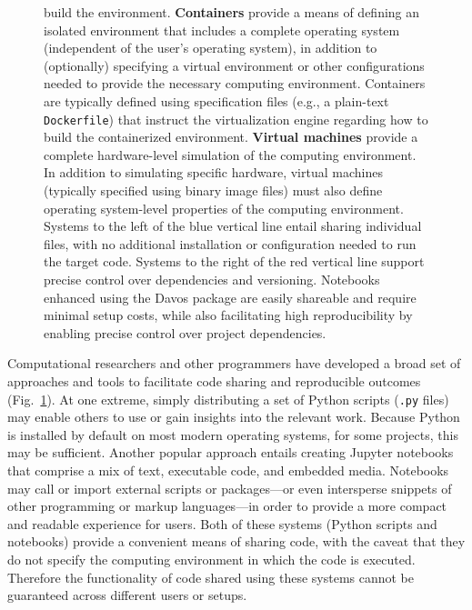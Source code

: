 \documentclass[preprint,12pt,a4paper]{elsarticle}
\begin{document}
\begin{figure}[tp]
{  build the environment.  \textbf{Containers} provide a means of
  defining an isolated environment that includes a complete operating
  system (independent of the user's operating system), in addition to
  (optionally) specifying a virtual environment or other
  configurations needed to provide the necessary computing
  environment.  Containers are typically defined using specification
  files (e.g., a plain-text \texttt{Dockerfile}) that instruct the
  virtualization engine regarding how to build the containerized
  environment.  \textbf{Virtual machines} provide a complete
  hardware-level simulation of the computing environment.  In addition
  to simulating specific hardware, virtual machines (typically
  specified using binary image files) must also define operating
  system-level properties of the computing environment.  Systems to
  the left of the blue vertical line entail sharing individual files,
  with no additional installation or configuration needed to run the
  target code.  Systems to the right of the red vertical line support
  precise control over dependencies and versioning.  Notebooks
  enhanced using the Davos package are easily shareable and
  require minimal setup costs, while also facilitating high
  reproducibility by enabling precise control over project
  dependencies.}
\label{fig:code-sharing}
\end{figure}

Computational researchers and other programmers have de\-vel\-oped a
broad set of approaches and tools to facilitate code sharing and
reproducible outcomes (Fig.~\ref{fig:code-sharing}). At one extreme,
simply distributing a set of Python scripts (\texttt{.py} files) may
enable others to use or gain insights into the relevant work. Because
Python is installed by default on most modern operating systems, for
some projects, this may be sufficient. Another popular approach
entails creating Jupyter notebooks~\cite{KluyEtal16} that comprise a
mix of text, executable code, and embedded media. Notebooks may call
or import external scripts or packages---or even intersperse snippets
of other programming or markup lang\-uages---in order to provide a
more compact and readable experience for users. Both of these systems
(Python scripts and notebooks) provide a convenient means of sharing
code, with the caveat that they do not specify the computing
environment in which the code is executed. Therefore the functionality
of code shared using these systems cannot be guaranteed across
different users or setups.
\end{document}
